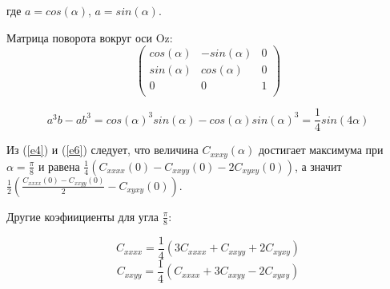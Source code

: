 \documentclass[a4paper,12pt]{article}
\begin{document}
где $a = cos(\alpha)$, $a = sin(\alpha)$.

Матрица поворота вокруг оси Oz:
\begin{equation} \label{e5}
\begin{pmatrix} 
cos(\alpha) & -sin(\alpha) & 0 \\
sin(\alpha) & cos(\alpha) & 0 \\
0 & 0 & 1 \\
\end{pmatrix} 
\end{equation} 

\begin{equation} \label{e6}
a^3 b - a b^3 = cos(\alpha)^3sin(\alpha) - cos(\alpha)sin(\alpha)^3 = \frac{1}{4}sin(4\alpha)
\end{equation}

Из (\ref{e4}) и (\ref{e6}) следует, что величина $C_{xxxy}(\alpha)$ достигает максимума при 
$\alpha = \frac{\pi}{8}$ и равена $\frac{1}{4}(C_{xxxx}(0) - C_{xxyy}(0) - 2 C_{xyxy}(0))$, а значит 
$\frac{1}{2}(\frac{C_{xxxx}(0) - C_{xxyy}(0)}{2} - C_{xyxy}(0))$.

Другие коэфиициенты для угла $\frac{\pi}{8}$:

$$
C_{xxxx} = \frac{1}{4}(3C_{xxxx}+C_{xxyy}+2C_{xyxy})
$$
$$
C_{xxyy} = \frac{1}{4}(C_{xxxx}+3C_{xxyy}-2C_{xyxy})
$$

\end{document}

